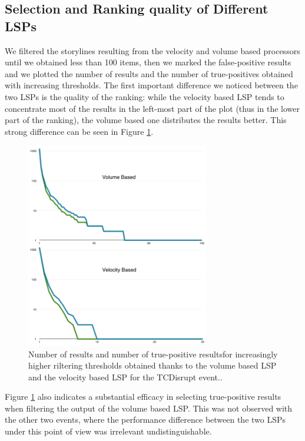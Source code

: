 \documentclass{sig-alternate}
\begin{document}
\subsection{Selection and Ranking quality of Different LSPs}
\label{sec:selection_and_ranking_quality}
We filtered the storylines resulting from the velocity and volume based processors until we obtained less than 100 items, then we marked the false-positive results and we plotted the number of results and the number of true-positives obtained with increasing thresholds. The first important difference we noticed between the two LSPs is the quality of the ranking: while the velocity based LSP tends to concentrate most of the results in the left-most part of the plot (thus in the lower part of the ranking), the volume based one distributes the results better. This strong difference can be seen in Figure \ref{fig:tcdisrupt_plots}.
\begin{figure}[htbp]
  \centering
  \includegraphics[width=8cm]{Figures/tcdisrupt_plots.png}
  \caption{Number of results and number of true-positive resultsfor increasingly higher riltering thresholds obtained thanks to the volume based LSP and the velocity based LSP for the TCDisrupt event.. }
  \label{fig:tcdisrupt_plots}
\end{figure}

Figure \ref{fig:tcdisrupt_plots} also indicates a substantial efficacy in selecting true-positive results when filtering the output of the volume based LSP. This was not observed with the other two events, where the performance difference between the two LSPs under this point of view was irrelevant undistinguishable.
\end{document}
